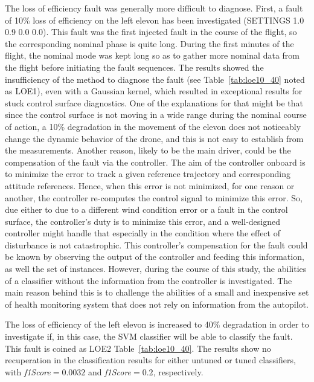The loss of efficiency fault was generally more difficult to diagnose. 
First, a fault of 10\% loss of efficiency on the left elevon has been investigated (SETTINGS 1.0 0.9 0.0 0.0). 
This fault was the first injected fault in the course of the flight, so the corresponding nominal phase is quite long. 
During the first minutes of the flight, the nominal mode was kept long so as to gather more nominal data from the flight before initiating the fault sequences. 
The results showed the insufficiency of the method to diagnose the fault (see Table~\ref{tab:loe10_40} noted as LOE1), even with a Gaussian kernel, which resulted in exceptional results for stuck control surface diagnostics. 
One of the explanations for that might be that since the control surface is not moving in a wide range during the nominal course of action, a 10\% degradation in the movement of the elevon does not noticeably change the dynamic behavior of the drone, and this is not easy to establish from the measurements.
Another reason, likely to be the main driver, could be the compensation of the fault via the controller.
The aim of the controller onboard is to minimize the error to track a given reference trajectory and corresponding attitude references. 
Hence, when this error is not minimized, for one reason or another, the controller re-computes the control signal to minimize this error. 
So, due either to due to a different wind condition error or a fault in the control surface, the controller's duty is to minimize this error, and a well-designed controller might handle that especially in the condition where the effect of disturbance is not catastrophic. 
This controller's compensation for the fault could be known by observing the output of the controller and feeding this information, as well the set of instances. 
However, during the course of this study, the abilities of a classifier without the information from the controller is investigated. 
The main reason behind this is to challenge the abilities of a small and inexpensive set of health monitoring system that does not rely on information from the autopilot. 

The loss of efficiency of the left elevon is increased to 40\% degradation in order to investigate if, in this case, the SVM classifier will be able to classify the fault. This fault is coined as LOE2 Table~\ref{tab:loe10_40}. The results show no recuperation in the classification results for either untuned or tuned classifiers, with \emph{f1Score}$=0.0032$ and \emph{f1Score}$=0.2$, respectively.


